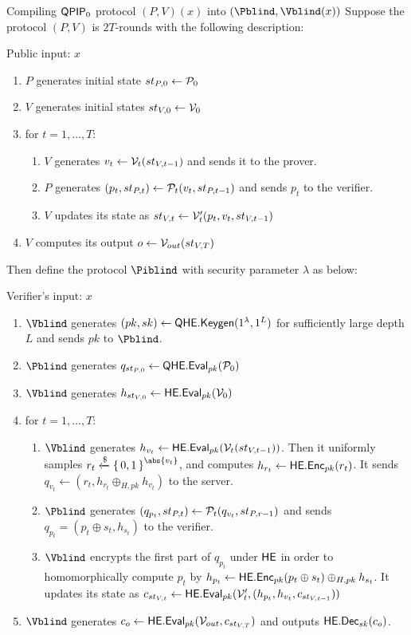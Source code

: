 \begin{protocol}{Compiling $\operatorname{\mathsf{QPIP}}_0$ protocol $(P, V)(x)$ into $(\Pblind, \Vblind(x))$}
	Suppose the protocol $(P, V)$ is $2T$-rounds with the following description:
	
	Public input: $x$
	\begin{enumerate}
		\item $P$ generates initial state $st_{P, 0}\leftarrow\mathcal{P}_0$
		\item $V$ generates initial states $st_{V, 0}\leftarrow\mathcal{V}_0$
		\item for $t=1,\ldots,T$:
		\begin{enumerate}
			\item $V$ generates $v_t\leftarrow\mathcal{V}_t(st_{V, t-1})$ and sends it to the prover.
			\item $P$ generates $(p_t, st_{P, t})\leftarrow\mathcal{P}_t(v_t, st_{P, t-1})$ and sends $p_t$ to the verifier.
			\item $V$ updates its state as $st_{V, t}\leftarrow\mathcal{V}_t'(p_t, v_t, st_{V, t-1})$
		\end{enumerate}
		\item $V$ computes its output $o\leftarrow\mathcal{V}_{out}(st_{V, T})$
	\end{enumerate}

	Then define the protocol $\Piblind$ with security parameter $\lambda$ as below:

	Verifier's input: $x$
	\begin{enumerate}
		\item $\Vblind$ generates $(pk, sk)\leftarrow\mathsf{QHE.Keygen}(1^\lambda, 1^L)$ for sufficiently large depth $L$ and sends $pk$ to $\Pblind$.
		\item $\Pblind$ generates $q_{st_{P, 0}}\leftarrow\mathsf{QHE.Eval}_{pk}(\mathcal{P}_0)$
		\item $\Vblind$ generates $h_{st_{V, 0}}\leftarrow\mathsf{HE.Eval}_{pk}(\mathcal{V}_0)$
		\item for $t=1,\ldots,T$:
		\begin{enumerate}
			\item $\Vblind$ generates $h_{v_t}\leftarrow\mathsf{HE.Eval}_{pk}(\mathcal{V}_t(st_{V, t-1}))$.
				Then it uniformly samples $r_t\xleftarrow{\$}\set{0,1}^{\abs{v_t}}$,
				and computes $h_{r_t}\leftarrow\mathsf{HE.Enc}_{pk}(r_t)$.
				It sends $q_{v_t}\leftarrow(r_t, h_{r_t}\oplus_{H, pk} h_{v_t})$ to the server.
			\item $\Pblind$ generates $(q_{p_t}, st_{P, t})\leftarrow\mathcal{P}_t(q_{v_t}, st_{P, r-1})$ and sends $q_{p_t}=(p_t\oplus s_t, h_{s_t})$ to the verifier.
			\item $\Vblind$ encrypts the first part of $q_{p_t}$ under $\mathsf{HE}$ in order to homomorphically compute $p_t$ by $h_{p_t}\leftarrow\mathsf{HE.Enc}_{pk}(p_t\oplus s_t)\oplus_{H, pk} h_{s_t}$.
				It updates its state as $c_{st_{V, t}}\leftarrow\mathsf{HE.Eval}_{pk}(\mathcal{V}_t', (h_{p_t}, h_{v_t}, c_{st_{V, t-1}}))$
		\end{enumerate}
		\item $\Vblind$ generates $c_o\leftarrow\mathsf{HE.Eval}_{pk}(\mathcal{V}_{out}, c_{st_{V, T}})$ and outputs $\mathsf{HE.Dec}_{sk}(c_o)$.
	\end{enumerate}

\end{protocol}

